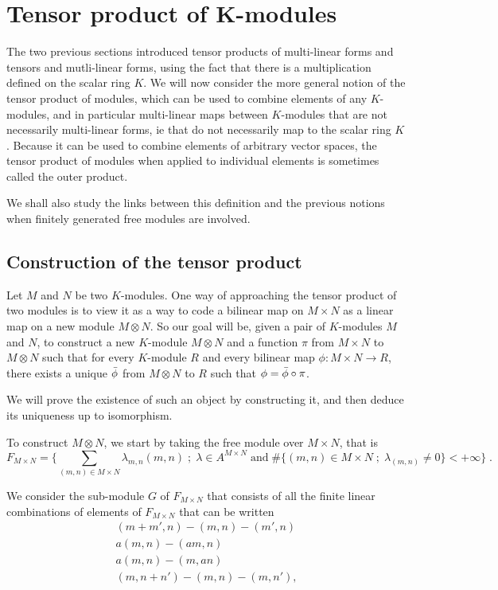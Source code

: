\documentclass{report}
\theoremstyle{definition}
\theoremstyle{remark}
\begin{document}
 \section{Tensor product of K-modules}
 
 
 The two previous sections introduced tensor products of multi-linear forms and tensors and mutli-linear forms, using the fact that there is a multiplication defined on the scalar ring $K$. We will now consider the more general notion of the tensor product of modules, which can be used to combine elements of any $K$-modules, and in particular multi-linear maps between $K$-modules that are not necessarily multi-linear forms, ie that do not necessarily map to the scalar ring $K$. Because it can be used to combine elements of arbitrary vector spaces, the tensor product of modules when applied to individual elements is sometimes called the outer product. 
 
 We shall also study the links between this definition and the previous notions when finitely generated free modules are involved. 
 
 
 \subsection{Construction of the tensor product}
 
  Let $M$ and $N$ be two $K$-modules. One way of approaching the tensor product of two modules is to view it as a way to code a bilinear map on $M\times N$ as a linear map on a new module $M \otimes N$. So our goal will be, given a pair of $K$-modules $M$ and $N$, to construct a new $K$-module $M\otimes N$ and a function $\pi$ from $M\times N$ to $M \otimes N$ such that for every $K$-module $R$ and every bilinear map $\phi: M\times N \longrightarrow R$, there exists a unique $\Bar{\phi}$ from $M \otimes N$ to $R$ such that $ \phi = \Bar{\phi} \circ \pi$. 
    
    
    We will prove the existence of such an object by constructing it, and then deduce its uniqueness up to isomorphism. 
    
    To construct $M\otimes N$, we start by taking the free module over $M \times N$, that is $$F_{M\times N} = \{ \sum_{(m,n)\in M\times N}\lambda_{m,n}(m,n) \;;\; \lambda\in A^{M\times N}  \; \textrm{and} \; \#\{ (m,n)\in M\times N \;;\;  \lambda_{(m,n)} \neq 0 \} < +\infty \} \;.$$ 
    
    We consider the sub-module $G$ of $F_{M\times N}$ that consists of all the finite linear combinations of elements of $F_{M\times N}$ that can be written 
    \begin{gather*}
        (m+m',n) - (m,n) -(m',n)\\ a(m,n) -(am,n)\\ a(m,n) - (m,an)\\(m,n+n') -(m,n) -(m,n'),
    \end{gather*}
    
\end{document}
